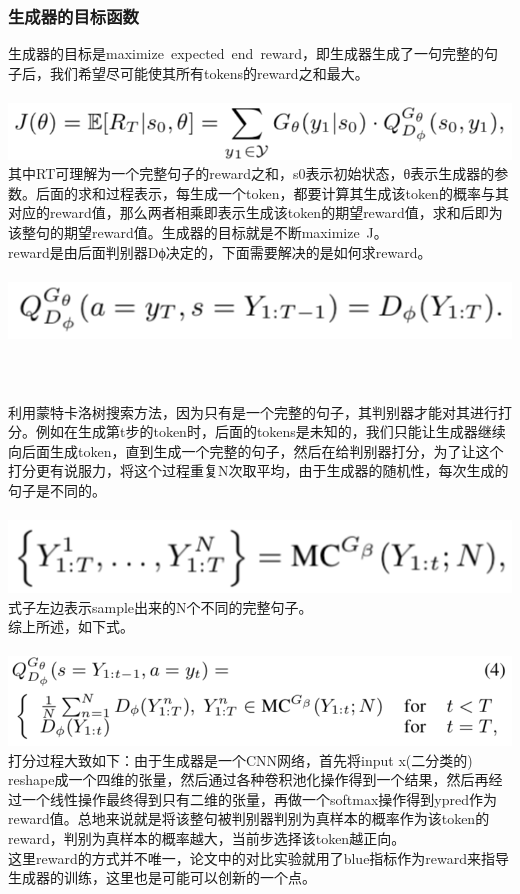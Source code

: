 \documentclass[11pt,a4paper]{ctexart}
\begin{document}
\subsubsection{生成器的目标函数}
\noindent 生成器的目标是maximize expected end reward，即生成器生成了一句完整的句子后，我们希望尽可能使其所有tokens的reward之和最大。\\\\
\includegraphics[scale=1]{2.png}\\
\noindent 其中RT可理解为一个完整句子的reward之和，s0表示初始状态，θ表示生成器的参数。后面的求和过程表示，每生成一个token，都要计算其生成该token的概率与其对应的reward值，那么两者相乘即表示生成该token的期望reward值，求和后即为该整句的期望reward值。生成器的目标就是不断maximize J。\\
reward是由后面判别器Dϕ决定的，下面需要解决的是如何求reward。\\\\
\includegraphics[scale=1]{3.png}\\\\\\\\
利用蒙特卡洛树搜索方法，因为只有是一个完整的句子，其判别器才能对其进行打分。例如在生成第t步的token时，后面的tokens是未知的，我们只能让生成器继续向后面生成token，直到生成一个完整的句子，然后在给判别器打分，为了让这个打分更有说服力，将这个过程重复N次取平均，由于生成器的随机性，每次生成的句子是不同的。\\\\
\includegraphics[scale=1]{4.png}\\
\noindent 式子左边表示sample出来的N个不同的完整句子。\\
综上所述，如下式。\\\\
\includegraphics[scale=1]{5.png}\\
\noindent 打分过程大致如下：由于生成器是一个CNN网络，首先将input x(二分类的) reshape成一个四维的张量，然后通过各种卷积池化操作得到一个结果，然后再经过一个线性操作最终得到只有二维的张量，再做一个softmax操作得到ypred作为reward值。总地来说就是将该整句被判别器判别为真样本的概率作为该token的reward，判别为真样本的概率越大，当前步选择该token越正向。\\
这里reward的方式并不唯一，论文中的对比实验就用了blue指标作为reward来指导生成器的训练，这里也是可能可以创新的一个点。
\end{document}
